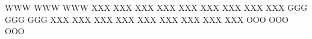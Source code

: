 \begin{center}
	\RubikFaceUp%
	{W}{W}{W}%
	{W}{W}{W}%
	{W}{W}{W}
	\RubikFaceRight%
	{X}{X}{X}%
	{X}{X}{X}%
	{X}{X}{X}
	\RubikFaceFront%
	{X}{X}{X}%
	{X}{X}{X}%
	{X}{X}{X}
	\hspace*{5mm}
	\RubikFaceUp%
	{X}{X}{X}%
	{X}{X}{X}%
	{X}{X}{X}
	\RubikFaceRight%
	{G}{G}{G}%
	{G}{G}{G}%
	{G}{G}{G}
	\RubikFaceFront%
	{X}{X}{X}%
	{X}{X}{X}%
	{X}{X}{X}
	\hspace*{5mm}
	\RubikFaceUp%
	{X}{X}{X}%
	{X}{X}{X}%
	{X}{X}{X}
	\RubikFaceRight%
	{X}{X}{X}%
	{X}{X}{X}%
	{X}{X}{X}
	\RubikFaceFront%
	{O}{O}{O}%
	{O}{O}{O}%
	{O}{O}{O}
\end{center}


